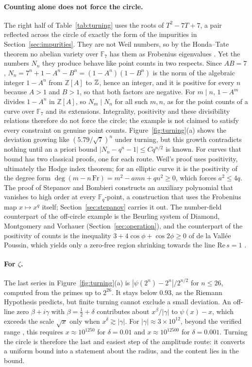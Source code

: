 \documentclass[11pt,a4paper]{article}
\theoremstyle{definition}\newtheorem{definition}[proposition]{Definition}
\theoremstyle{remark}\newtheorem{remark}[proposition]{Remark}
\begin{document}
\paragraph{Counting alone does not force the circle.} The right half of Table~\ref{tab:turning} uses the roots of $T^2-7T+7$, a pair reflected across the circle of exactly the form of the impurities in Section~\ref{sec:impurities}. They are not Weil numbers, so by the Honda--Tate theorem no abelian variety over $\mathbb F_7$ has them as Frobenius eigenvalues \cite{Tate1966,Honda1968}. Yet the numbers $N_n$ they produce behave like point counts in two respects. Since $AB=7$, $N_n=7^n+1-A^n-B^n=(1-A^n)(1-B^n)$ is the norm of the algebraic integer $1-A^n$ from $\mathbb Z[A]$ to $\mathbb Z$, hence an integer, and it is positive for every $n$ because $A>1$ and $B>1$, so that both factors are negative. For $m\mid n$, $1-A^m$ divides $1-A^n$ in $\mathbb Z[A]$, so $N_m\mid N_n$ for all such $m,n$, as for the point counts of a curve over $\mathbb F_7$ and its extensions. Integrality, positivity and these divisibility relations therefore do not force the circle; the example is not claimed to satisfy every constraint on genuine point counts. Figure~\ref{fig:turning}(a) shows the deviation growing like $(5.79/\sqrt7)^n$ under turning, but this growth contradicts nothing until an a priori bound $|N_n-q^n-1|\le Cq^{n/2}$ is known. For curves that bound has two classical proofs, one for each route. Weil's proof uses positivity, ultimately the Hodge index theorem; for an elliptic curve it is the positivity of the degree form $\deg(m-n\,\mathrm{Fr})=m^2-amn+qn^2\ge0$, which forces $a^2\le4q$. The proof of Stepanov and Bombieri \cite{Stepanov1969,Bombieri1974} constructs an auxiliary polynomial that vanishes to high order at every $\mathbb F_q$-point, a construction that uses the Frobenius map $x\mapsto x^q$ itself; Section~\ref{sec:stepanov} carries it out. The number-field counterpart of the off-circle example is the Beurling system of Diamond, Montgomery and Vorhauer \cite{DMV2006} (Section~\ref{sec:operation}), and the counterpart of the positivity of counts is the inequality $3+4\cos\phi+\cos2\phi\ge0$ of de la Vall\'ee Poussin, which yields only a zero-free region shrinking towards the line $\mathrm{Re}\,s=1$ \cite{Ingham1932}.

\paragraph{For $\zeta$.} The last series in Figure~\ref{fig:turning}(a) is $|\psi(2^n)-2^n|/2^{n/2}$ for $n\le26$, computed from the primes up to $2^{26}$. It stays below $0.93$, as the Riemann Hypothesis predicts, but finite turning cannot exclude a small deviation. An off-line zero $\beta+i\gamma$ with $\beta=\tfrac12+\delta$ contributes about $x^{\beta}/|\gamma|$ to $\psi(x)-x$, which exceeds the scale $\sqrt x$ only when $x^{\delta}\gtrsim|\gamma|$. For $|\gamma|\approx3\times10^{12}$, beyond the verified range \cite{PlattTrudgian2021}, this requires $x\approx10^{1250}$ for $\delta=0.01$ and $x\approx10^{12500}$ for $\delta=0.001$. Turning the circle is therefore the last and easiest step of the amplitude route: it converts a uniform bound into a statement about the radius, and the content lies in the bound.
\end{document}
